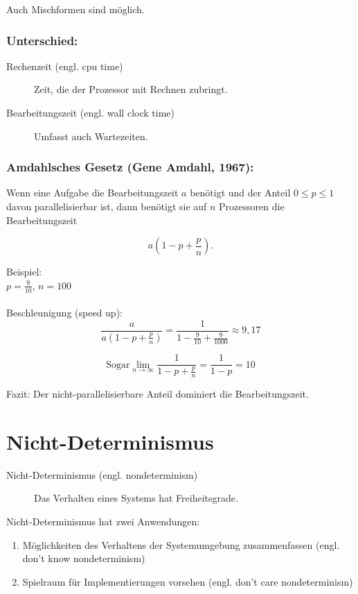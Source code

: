 Auch Mischformen sind möglich.
\subsubsection*{Unterschied:}
\begin{description}
\item[Rechenzeit (engl. cpu time)] Zeit, die der Prozessor mit Rechnen zubringt.
\item[Bearbeitungszeit (engl. wall clock time)] Umfasst auch Wartezeiten.
\end{description}

\subsubsection*{Amdahlsches Gesetz (Gene Amdahl, 1967):}
Wenn eine Aufgabe die Bearbeitungszeit $ a $ benötigt und der Anteil $ 0 \leq p \leq 1 $ davon parallelisierbar ist, dann benötigt sie auf $ n $ Prozessoren die Bearbeitungszeit

\begin{equation}
a \left( 1 - p + \frac{p}{n} \right).
\end{equation}

Beispiel:\\
$ p = \frac{9}{10} $, $ n = 100 $\\
\\
Beschleunigung (speed up):
\begin{equation*}
 \frac{a}{a \left( 1 - p + \frac{p}{n} \right)} = \frac{1}{1 - \frac{9}{10} + \frac{9}{1000}} \approx 9,17
\end{equation*}

\begin{equation*}
\text{Sogar} \lim\limits_{n \to \infty} \frac{1}{1 - p + \frac{p}{n}} = \frac{1}{1 - p} = 10
\end{equation*}

Fazit: Der nicht-parallelisierbare Anteil dominiert die Bearbeitungszeit.

\section{Nicht-Determinismus}
\begin{description}
\item[Nicht-Determinismus (engl. nondeterminism)] Das Verhalten eines Systems hat Freiheitsgrade.
\end{description}

Nicht-Determinismus hat zwei Anwendungen:
\begin{enumerate}
\item Möglichkeiten des Verhaltens der Systemumgebung zusammenfassen (engl. don't know nondeterminism)
\item Spielraum für Implementierungen vorsehen (engl. don't care nondeterminism)
\end{enumerate}

